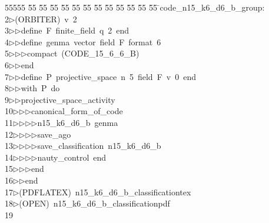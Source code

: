 %
%
\begin{tabbing}
55555 \= 55 \= 55 \= 55 \= 55 \= 55 \= 55 \= 55 \= 55 \= 55 \= 55 \= 55 \= 55 \= \>code\_n15\_k6\_d6\_b\_group:\\[0pt]
2\>$\triangleright$\>(ORBITER)\ v\ 2\ \\[0pt]
3\>$\triangleright$\>$\triangleright$\>define\ F\ finite\_field\ q\ 2\ end\ \\[0pt]
4\>$\triangleright$\>$\triangleright$\>define\ genma\ vector\ field\ F\ format\ 6\ \\[0pt]
5\>$\triangleright$\>$\triangleright$\>$\triangleright$\>compact\ (CODE\_15\_6\_6\_B)\ \\[0pt]
6\>$\triangleright$\>$\triangleright$\>end\ \\[0pt]
7\>$\triangleright$\>$\triangleright$\>define\ P\ projective\_space\ n\ 5\ field\ F\ v\ 0\ end\ \\[0pt]
8\>$\triangleright$\>$\triangleright$\>with\ P\ do\ \\[0pt]
9\>$\triangleright$\>$\triangleright$\>projective\_space\_activity\ \\[0pt]
10\>$\triangleright$\>$\triangleright$\>$\triangleright$\>canonical\_form\_of\_code\ \\[0pt]
11\>$\triangleright$\>$\triangleright$\>$\triangleright$\>$\triangleright$\>n15\_k6\_d6\_b\ genma\ \\[0pt]
12\>$\triangleright$\>$\triangleright$\>$\triangleright$\>$\triangleright$\>save\_ago\ \\[0pt]
13\>$\triangleright$\>$\triangleright$\>$\triangleright$\>$\triangleright$\>save\_classification\ n15\_k6\_d6\_b\ \\[0pt]
14\>$\triangleright$\>$\triangleright$\>$\triangleright$\>$\triangleright$\>nauty\_control\ end\ \\[0pt]
15\>$\triangleright$\>$\triangleright$\>$\triangleright$\>end\ \\[0pt]
16\>$\triangleright$\>$\triangleright$\>end\\[0pt]
17\>$\triangleright$\>(PDFLATEX)\ n15\_k6\_d6\_b\_classificationtex\\[0pt]
18\>$\triangleright$\>(OPEN)\ n15\_k6\_d6\_b\_classificationpdf\\[0pt]
19\>\end{tabbing}
